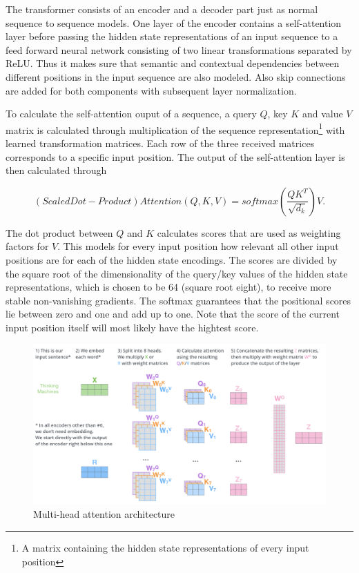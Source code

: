 The transformer consists of an encoder and a decoder part just as normal sequence to sequence models. One layer of the encoder contains a self-attention layer before passing the hidden state representations of an input sequence to a feed forward neural network consisting of two linear transformations separated by \ac{ReLU}. Thus it makes sure that semantic and contextual dependencies between different positions in the input sequence are also modeled. Also skip connections are added for both components with subsequent layer normalization. \cite{Alammar2018, Vaswani2017}

To calculate the self-attention ouput of a sequence, a query $Q$, key $K$ and value $V$ matrix is calculated through multiplication of the sequence representation\footnote{A matrix containing the hidden state representations of every input position} with learned transformation matrices. Each row of the three received matrices corresponds to a specific input position. The output of the self-attention layer is then calculated through

\begin{equation}
	(Scaled Dot-Product) Attention(Q, K, V) = softmax(\frac{QK^T}{\sqrt{d_k}})V.
\end{equation}

The dot product between $Q$ and $K$ calculates scores that are used as weighting factors for $V$. This models for every input position how relevant all other input positions are for each of the hidden state encodings. The scores are divided by the square root of the dimensionality of the query/key values of the hidden state representations, which is chosen to be 64 (square root eight), to receive more stable non-vanishing gradients. The softmax guarantees that the positional scores lie between zero and one and add up to one. Note that the score of the current input position itself will most likely have the hightest score. \cite{Alammar2018, Vaswani2017}

\begin{figure}[ht]
	\centering
	\includegraphics[width=\linewidth]{figures/multi_head_attention.png}
	\caption{Multi-head attention architecture \cite{Alammar2018}}
	\label{multi-head-attention}
\end{figure}

